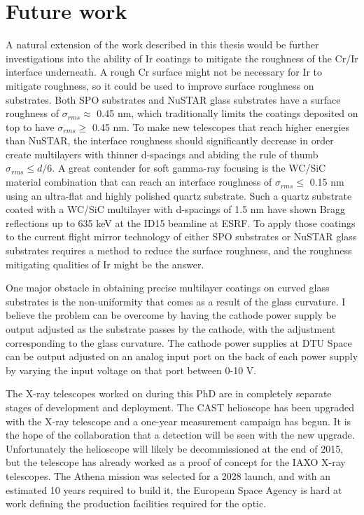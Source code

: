 \section{Future work}
A natural extension of the work described in this thesis would be further investigations into the ability of Ir coatings to mitigate the roughness of the Cr/Ir interface underneath. A rough Cr surface might not be necessary for Ir to mitigate roughness, so it could be used to improve surface roughness on substrates. Both SPO substrates and NuSTAR glass substrates have a surface roughness of $\sigma_{rms}\approx$ 0.45 nm, which traditionally limits the coatings deposited on top to have $\sigma_{rms}\geq$ 0.45 nm. To make new telescopes that reach higher energies than NuSTAR, the interface roughness should significantly decrease in order create multilayers with thinner d-spacings and abiding the rule of thumb $\sigma_{rms} \leq d/6$. A great contender for soft gamma-ray focusing is the WC/SiC material combination that can reach an interface roughness of $\sigma_{rms}\leq$ 0.15 nm using an ultra-flat and highly polished quartz substrate. Such a quartz substrate coated with a WC/SiC multilayer with d-spacings of 1.5 nm have shown Bragg reflections up to 635 keV at the ID15 beamline at ESRF\cite{FernandezPerea:2012fj,FernandezPerea:2013jb}. To apply those coatings to the current flight mirror technology of either SPO substrates or NuSTAR glass substrates requires a method to reduce the surface roughness, and the roughness mitigating qualities of Ir might be the answer.

One major obstacle in obtaining precise multilayer coatings on curved glass substrates is the non-uniformity that comes as a result of the glass curvature. I believe the problem can be overcome by having the cathode power supply be output adjusted as the substrate passes by the cathode, with the adjustment corresponding to the glass curvature. The cathode power supplies at DTU Space can be output adjusted on an analog input port on the back of each power supply by varying the input voltage on that port between 0-10 V.

The X-ray telescopes worked on during this PhD are in completely separate stages of development and deployment. The CAST helioscope has been upgraded with the X-ray telescope and a one-year measurement campaign has begun. It is the hope of the collaboration that a detection will be seen with the new upgrade. Unfortunately the helioscope will likely be decommissioned at the end of 2015, but the telescope has already worked as a proof of concept for the IAXO X-ray telescopes. The Athena mission was selected for a 2028 launch, and with an estimated 10 years required to build it, the European Space Agency is hard at work defining the production facilities required for the optic.
